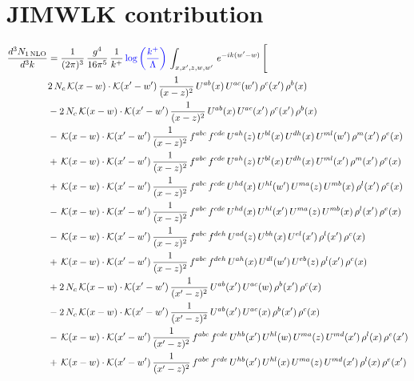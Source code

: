 \documentclass[9pt]{article}
\numberwithin{equation}{section}
\begin{document}
\section{JIMWLK contribution}
\begin{align}
\frac{d^{3}N_{1\,\mathrm{NLO}}}{d^{3}k} & = \frac{1}{(2\pi)^{3}}\,\frac{g^{4}}{16\pi^{5}}\,\frac{1}{k^{+}}\,{\color{blue}\log{\left(\frac{k^{+}}{\Lambda}\right)}}\,\int_{x,x',z,w,w'}\,e^{-ik(w'-w)}\,\Bigg[\notag\\
&2\,N_{c}\,\mathcal{K}(x-w)\cdot\mathcal{K}(x'-w')\,\frac{1}{(x-z)^{2}}\,U^{ab}(x)\,U^{ac}(w')\,\rho^{c}(x')\,\rho^{b}(x)\notag\\
&-2\,N_{c}\,\mathcal{K}(x-w)\cdot\mathcal{K}(x'-w')\,\frac{1}{(x-z)^{2}}\,U^{ab}(x)\,U^{ac}(x')\,\rho^{c}(x')\,\rho^{b}(x)\notag\\
&-\,\mathcal{K}(x-w)\cdot\mathcal{K}(x'-w')\,\frac{1}{(x-z)^{2}}\,f^{abc}\,f^{cde}\,U^{ah}(z)\,U^{bl}(x)\,U^{dh}(x)\,U^{ml}(w')\,\rho^{m}(x')\,\rho^{e}(x)\notag\\
&+\,\mathcal{K}(x-w)\cdot\mathcal{K}(x'-w')\,\frac{1}{(x-z)^{2}}\,f^{abc}\,f^{cde}\,U^{ah}(z)\,U^{bl}(x)\,U^{dh}(x)\,U^{ml}(x')\,\rho^{m}(x')\,\rho^{e}(x)\notag\\
&+\,\mathcal{K}(x-w)\cdot\mathcal{K}(x'-w')\,\frac{1}{(x-z)^{2}}\,f^{abc}\,f^{cde}\,U^{hd}(x)\,U^{hl}(w')\,U^{ma}(z)\,U^{mb}(x)\,\rho^{l}(x')\,\rho^{e}(x)\notag\\
&-\,\mathcal{K}(x-w)\cdot\mathcal{K}(x'-w')\,\frac{1}{(x-z)^{2}}\,f^{abc}\,f^{cde}\,U^{hd}(x)\,U^{hl}(x')\,U^{ma}(z)\,U^{mb}(x)\,\rho^{l}(x')\,\rho^{e}(x)\notag\\
&-\,\mathcal{K}(x-w)\cdot\mathcal{K}(x'-w')\,\frac{1}{(x-z)^{2}}\,f^{abc}\,f^{deh}\,U^{ad}(z)\,U^{bh}(x)\,U^{el}(x')\,\rho^{l}(x')\,\rho^{c}(x)\notag\\
&+\,\mathcal{K}(x-w)\cdot\mathcal{K}(x'-w')\,\frac{1}{(x-z)^{2}}\,f^{abc}\,f^{deh}\,U^{ah}(x)\,U^{dl}(w')\,U^{eb}(z)\,\rho^{l}(x')\,\rho^{c}(x)\notag\\
&+2\,N_{c}\,\mathcal{K}(x-w)\cdot\mathcal{K}(x'-w')\,\frac{1}{(x'-z)^{2}}\,U^{ab}(x')\,U^{ac}(w)\,\rho^{b}(x')\,\rho^{c}(x)\notag\\
&-2\,N_{c}\,\mathcal{K}(x-w)\cdot\mathcal{K}(x'-w')\,\frac{1}{(x'-z)^{2}}\,U^{ab}(x')\,U^{ac}(x)\,\rho^{b}(x')\,\rho^{c}(x)\notag\\
&-\,\mathcal{K}(x-w)\cdot\mathcal{K}(x'-w')\,\frac{1}{(x'-z)^{2}}\,f^{abc}\,f^{cde}\,U^{hb}(x')\,U^{hl}(w)\,U^{ma}(z)\,U^{md}(x')\,\rho^{l}(x)\,\rho^{e}(x')\notag\\
&+\,\mathcal{K}(x-w)\cdot\mathcal{K}(x'-w')\,\frac{1}{(x'-z)^{2}}\,f^{abc}\,f^{cde}\,U^{hb}(x')\,U^{hl}(x)\,U^{ma}(z)\,U^{md}(x')\,\rho^{l}(x)\,\rho^{e}(x')\notag\\

\end{align}
\end{document}
